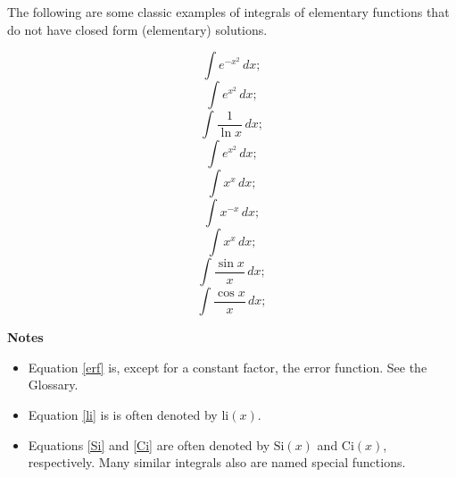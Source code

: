 \renewcommand{\thefootnote}{\fnsymbol{footnote}}	
The following are some classic examples of integrals of elementary functions that do not have closed form (\gls{elementary}) solutions.  

\begin{equation}
\label{erf}
\int{e^{-x^2}\,dx};
\end{equation}
\begin{equation}
\label{exp_x_squared}
\int{e^{x^2}\,dx};
\end{equation}
\begin{equation}
\label{li}
\int{\frac{1}{\ln{x}}\,dx};
\end{equation}
\begin{equation}
\label{exp_x_squared}
\int{e^{x^2}\,dx};
\end{equation}
\begin{equation}
\label{x_to_the_x}
\int{x^x\,dx};
\end{equation}
\begin{equation}
\label{x_to_the_neg_x}
\int{x^{-x}\,dx};
\end{equation}
\begin{equation}
\label{x_to_the_x}
\int{x^x\,dx};
\end{equation}
\begin{equation}
\label{Si}
\int{\frac{\sin{x}}{x}\,dx};
\end{equation}
\begin{equation}
\label{Ci}
\int{\frac{\cos{x}}{x}\,dx};
\end{equation}

\textbf{Notes}
\begin{itemize}
\item Equation \ref{erf} is, except for a constant factor, the
\gls{error function}.  See the Glossary.
\item Equation \ref{li} is is often denoted by $\mathrm{li}(x)$.
\item Equations \ref{Si} and \ref{Ci} are often denoted by
$\mathrm{Si}(x)$ and $\mathrm{Ci}(x)$, respectively.  Many similar
integrals also are named special functions.
\end{itemize}